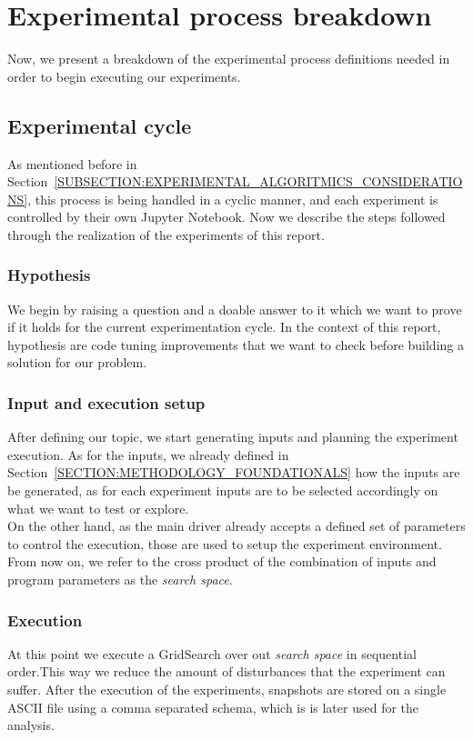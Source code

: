 \section{Experimental process breakdown}
Now, we present a breakdown of the experimental process definitions needed in order to begin executing our experiments.\\

\subsection{Experimental cycle}
As mentioned before in Section~\ref{SUBSECTION:EXPERIMENTAL_ALGORITMICS_CONSIDERATIONS}, this process is being handled in a cyclic manner, and each experiment is controlled by their own Jupyter Notebook. Now we describe the steps followed through the realization of the experiments of this report.\\

\subsubsection{Hypothesis}
We begin by raising a question and a doable answer to it which we want to prove if it holds for the current experimentation cycle. In the context of this report, hypothesis are code tuning improvements that we want to check before building a solution for our problem.\\

\subsubsection{Input and execution setup}
After defining our topic, we start generating inputs and planning the experiment execution. As for the inputs, we already defined in Section~\ref{SECTION:METHODOLOGY_FOUNDATIONALS} how the inputs are be generated, as for each experiment inputs are to be selected accordingly on what we want to test or explore. \\

On the other hand, as the main driver already accepts a defined set of parameters to control the execution, those are used to setup the experiment environment. From now on, we refer to the cross product of the combination of inputs and program parameters as the \textit{search space}.\\

\subsubsection{Execution}
At this point we execute a GridSearch over out \textit{search space} in sequential order.This way we reduce the amount of disturbances that the experiment can suffer. After the execution of the experiments, snapshots are stored on a single ASCII file using a comma separated schema, which is is later used for the analysis.\\

